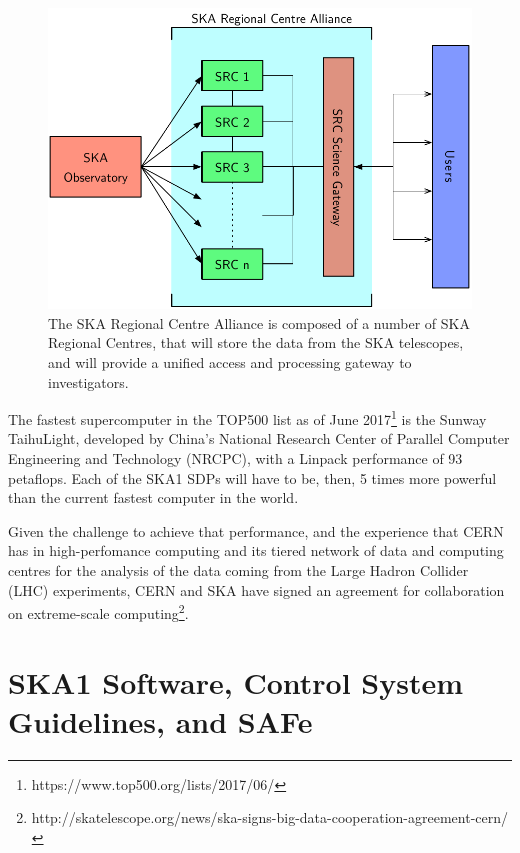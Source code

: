 \documentclass[a4paper,
               biblatex,       %
               keeplastbox,    %
               ]{jacow-2_1}    %
\begin{document}
\begin{figure}[!tb]
  \centering
    \includegraphics[width=\columnwidth]{figs/SRCs.pdf}
  \caption{The SKA Regional Centre Alliance is composed of a number of SKA Regional Centres, that will store the data from the SKA telescopes, and will provide a unified access and processing gateway to investigators.}
  \label{fig:figs_SRCs}
\end{figure}

The fastest supercomputer in the TOP500 list as of June 2017\footnote{https://www.top500.org/lists/2017/06/} is the Sunway TaihuLight, developed by China’s National Research Center of Parallel Computer Engineering and Technology (NRCPC), with a Linpack performance of 93 petaflops. Each of the SKA1 SDPs will have to be, then, 5 times more powerful than the current fastest computer in the world.

Given the challenge to achieve that performance, and the experience that CERN has in high-perfomance computing and its tiered network of data and computing centres for the analysis of the data coming from the Large Hadron Collider (LHC) experiments, CERN and SKA have signed an agreement for collaboration on extreme-scale computing\footnote{http://skatelescope.org/news/ska-signs-big-data-cooperation-agreement-cern/}.


\section{SKA1 Software, Control System Guidelines, and SAFe} %
\label{sec:ska1_software_control_system_guidelines_SAFe}
\end{document}
